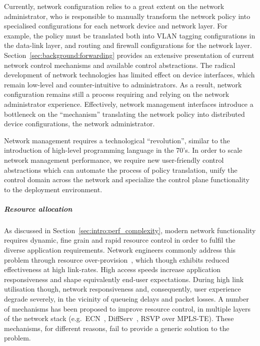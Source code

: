 Currently, network configuration relies to a great extent on the network
administrator, who is responsible to manually transform the network policy into
specialised configurations for each network device and network layer.  For
example, the policy must be translated both into VLAN tagging configurations in
the data-link layer, and routing and firewall configurations for the network
layer.  Section~\ref{sec:background:forwarding} provides an extensive
presentation of current network control mechanisms and available control
abstractions.  
The radical development of network technologies has limited effect on device
interfaces, which remain low-level and counter-intuitive to
administrators. As a result, network configuration remains still a process
requiring and relying on the network administrator experience.  Effectively,
network management interfaces introduce a bottleneck on the ``mechanism''
translating the network policy into distributed device configurations, the
network administrator.  

Network management requires a technological ``revolution'', similar to the
introduction of high-level programming language in the 70's.  In order to scale
network management performance, we require new user-friendly control
abstractions which can automate the process of policy translation, unify the
control domain across the network and specialize the control plane functionality
to the deployment environment. 


\subparagraph*{Resource allocation} 

As discussed in Section~\ref{sec:intro:perf_complexity}, modern network
functionality requires dynamic, fine grain and rapid resource control in order
to fulfil the diverse application requirements.  Network engineers commonly
address this problem through resource over-provision~\cite{TeiSha02}, which
though exhibits reduced effectiveness at high link-rates. High access speeds
increase application responsiveness and shape equivalently end-user
expectations.  During high link utilisation though, network responsiveness and,
consequently, user experience 
degrade severely, in the vicinity of queueing delays and packet losses.  A
number of mechanisms has been proposed to improve resource control, in multiple
layers of the network stack (e.g.~ECN~\cite{RFC5562}, DiffServ~\cite{RFC2475},
RSVP over MPLS-TE\cite{RFC3209}). These mechanisms, for different reasons,  fail
to provide a generic solution to the problem. 

